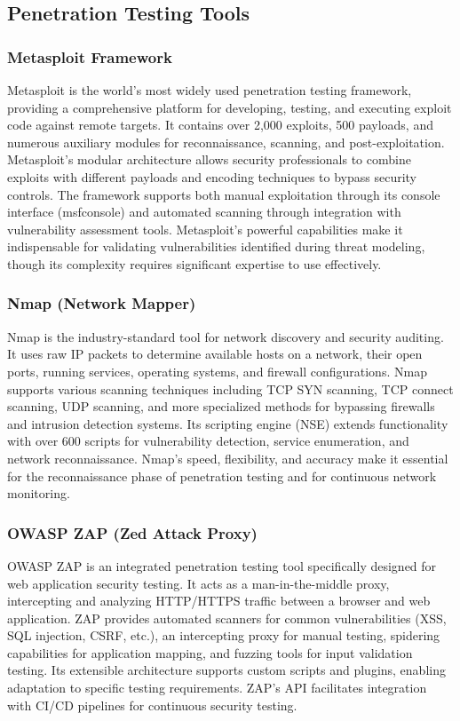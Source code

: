 \subsection{Penetration Testing Tools}

\subsubsection{Metasploit Framework}
Metasploit is the world's most widely used penetration testing framework, providing a comprehensive platform for developing, testing, and executing exploit code against remote targets. It contains over 2,000 exploits, 500 payloads, and numerous auxiliary modules for reconnaissance, scanning, and post-exploitation. Metasploit's modular architecture allows security professionals to combine exploits with different payloads and encoding techniques to bypass security controls. The framework supports both manual exploitation through its console interface (msfconsole) and automated scanning through integration with vulnerability assessment tools. Metasploit's powerful capabilities make it indispensable for validating vulnerabilities identified during threat modeling, though its complexity requires significant expertise to use effectively.

\subsubsection{Nmap (Network Mapper)}
Nmap is the industry-standard tool for network discovery and security auditing. It uses raw IP packets to determine available hosts on a network, their open ports, running services, operating systems, and firewall configurations. Nmap supports various scanning techniques including TCP SYN scanning, TCP connect scanning, UDP scanning, and more specialized methods for bypassing firewalls and intrusion detection systems. Its scripting engine (NSE) extends functionality with over 600 scripts for vulnerability detection, service enumeration, and network reconnaissance. Nmap's speed, flexibility, and accuracy make it essential for the reconnaissance phase of penetration testing and for continuous network monitoring.

\subsubsection{OWASP ZAP (Zed Attack Proxy)}
OWASP ZAP is an integrated penetration testing tool specifically designed for web application security testing. It acts as a man-in-the-middle proxy, intercepting and analyzing HTTP/HTTPS traffic between a browser and web application. ZAP provides automated scanners for common vulnerabilities (XSS, SQL injection, CSRF, etc.), an intercepting proxy for manual testing, spidering capabilities for application mapping, and fuzzing tools for input validation testing. Its extensible architecture supports custom scripts and plugins, enabling adaptation to specific testing requirements. ZAP's API facilitates integration with CI/CD pipelines for continuous security testing.

